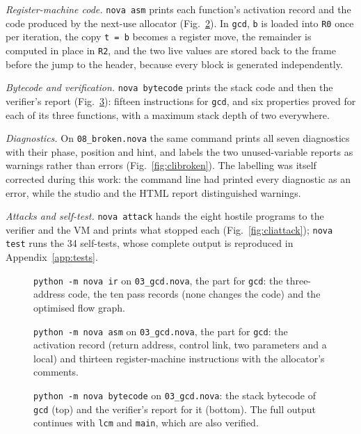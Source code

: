 \documentclass[conference]{IEEEtran}
\newcommand{\code}[1]{\texttt{#1}}
\begin{document}
\emph{Register-machine code.} \code{nova asm} prints each function's activation record and the code produced by the next-use allocator (Fig.~\ref{fig:cliasm}). In \code{gcd}, \code{b} is loaded into \code{R0} once per iteration, the copy \code{t = b} becomes a register move, the remainder is computed in place in \code{R2}, and the two live values are stored back to the frame before the jump to the header, because every block is generated independently.

\emph{Bytecode and verification.} \code{nova bytecode} prints the stack code and then the verifier's report (Fig.~\ref{fig:clibc}): fifteen instructions for \code{gcd}, and six properties proved for each of its three functions, with a maximum stack depth of two everywhere.

\emph{Diagnostics.} On \code{08\_broken.nova} the same command prints all seven diagnostics with their phase, position and hint, and labels the two unused-variable reports as warnings rather than errors (Fig.~\ref{fig:clibroken}). The labelling was itself corrected during this work: the command line had printed every diagnostic as an error, while the studio and the HTML report distinguished warnings.

\emph{Attacks and self-test.} \code{nova attack} hands the eight hostile programs to the verifier and the VM and prints what stopped each (Fig.~\ref{fig:cliattack}); \code{nova test} runs the 34 self-tests, whose complete output is reproduced in Appendix~\ref{app:tests}.

\begin{figure}[!tbp]

\caption{\code{python -m nova ir} on \code{03\_gcd.nova}, the part for \code{gcd}: the three-address code, the ten pass records (none changes the code) and the optimised flow graph.}
\label{fig:cliir}
\end{figure}

\begin{figure}[!tbp]

\caption{\code{python -m nova asm} on \code{03\_gcd.nova}, the part for \code{gcd}: the activation record (return address, control link, two parameters and a local) and thirteen register-machine instructions with the allocator's comments.}
\label{fig:cliasm}
\end{figure}

\begin{figure}[!tbp]

\vspace{2pt}

\caption{\code{python -m nova bytecode} on \code{03\_gcd.nova}: the stack bytecode of \code{gcd} (top) and the verifier's report for it (bottom). The full output continues with \code{lcm} and \code{main}, which are also verified.}
\label{fig:clibc}
\end{figure}
\end{document}
